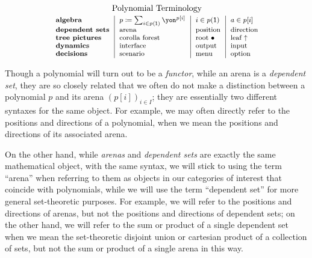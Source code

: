 \documentclass[Book-Poly]{subfiles}
\begin{document}
\begin{equation}%
\footnotesize
\begin{tabular}{l|l|l|l}
\multicolumn{4}{c}{\normalsize Polynomial Terminology}\\[3pt]
\textbf{algebra} & $p \coloneqq \sum_{i \in p(\1)} \yon^{p[i]}$ & $i \in p(\1)$ & $a \in p[i]$ \\
\textbf{dependent sets} & arena & position & direction \\
\textbf{tree pictures} & corolla forest & root $\bullet$ & leaf $\uparrow$ \\
\textbf{dynamics} & interface & output & input \\
\textbf{decisions} & scenario & menu & option \\
\end{tabular}
\end{equation}

\begin{remark}
Though a polynomial will turn out to be a \emph{functor}, while an arena is a \emph{dependent set}, they are so closely related that we often do not make a distinction between a polynomial $p$ and its arena $(p[i])_{i \in I}$; they are essentially two different syntaxes for the same object.
For example, we may often directly refer to the positions and directions of a polynomial, when we mean the positions and directions of its associated arena.

On the other hand, while \emph{arenas} and \emph{dependent sets} are exactly the same mathematical object, with the same syntax, we will stick to using the term ``arena'' when referring to them as objects in our categories of interest that coincide with polynomials, while we will use the term ``dependent set'' for more general set-theoretic purposes.
For example, we will refer to the positions and directions of arenas, but not the positions and directions of dependent sets; on the other hand, we will refer to the sum or product of a single dependent set when we mean the set-theoretic disjoint union or cartesian product of a collection of sets, but not the sum or product of a single arena in this way.
\end{remark}
\end{document}
